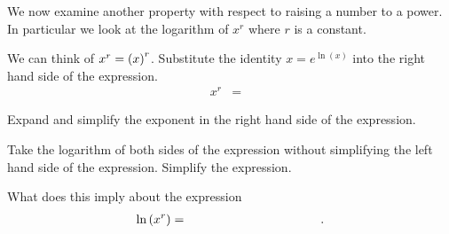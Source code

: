 \begin{problem}
\item We now examine another property with respect to raising a number
  to a power. In particular we look at the logarithm of $x^r$ where
  $r$ is a constant.
  \label{problem:exponenetialPropTwo}
  \begin{subproblem}
  \item We can think of $x^r=\left( x \right)^r$. Substitute the identity
    $x=e^{\ln(x)}$ into the right hand side of the expression.
    \begin{eqnarray}
      \label{eqn:exponentialMultiplication}
      x^r & = &
    \end{eqnarray}
    \item Expand and simplify the exponent in the right hand side of
      the expression.
      \vfill
    \item Take the logarithm of both sides of the expression without
      simplifying the left hand side of the expression. Simplify the
      expression.
      \vfill
    \item What does this imply about the expression
    \begin{eqnarray*}
      \ln\lp x^r \rp & = & \hspace{10em}.
    \end{eqnarray*}
  \end{subproblem}


\end{problem}

\postClass

